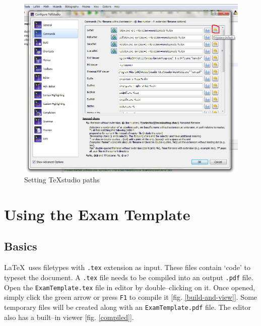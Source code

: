 \documentclass[12pt,a4paper]{article}
\begin{document}
\begin{figure}[H]
\centering
\includegraphics[scale=0.65]{TeXstudioPath.png}
\caption{Setting TeXstudio paths}
\label{texstudio-paths}
\end{figure}
\section{Using the Exam Template}
\subsection{Basics}
\LaTeX~uses filetypes with \verb|.tex| extension as input. These files contain `code' to typeset the document. A \verb|.tex| file needs to be compiled into an output \verb|.pdf| file. Open the \verb|ExamTemplate.tex| file in editor by double--clicking on it. Once opened, simply click the green arrow or press \verb|F1| to compile it [fig. \ref{build-and-view}]. Some temporary files will be created along with an \verb|ExamTemplate.pdf| file. The editor also has a built--in viewer [fig. \ref{compiled}].
\end{document}
